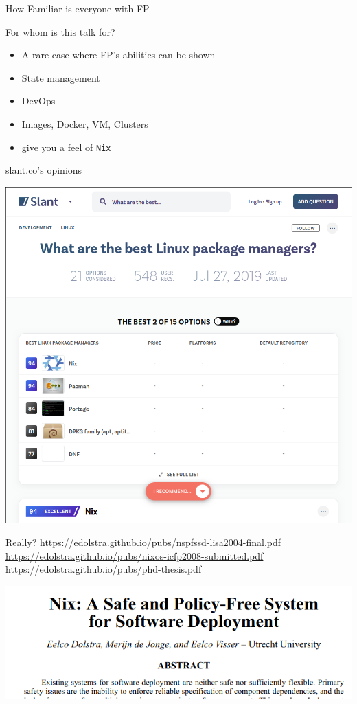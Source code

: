 \documentclass[presentation]{beamer}
\begin{document}
\begin{frame}[label={sec:org583bd86},fragile]{How Familiar is everyone with FP}
\begin{block}{For whom is this talk for?}
\begin{itemize}
\item A rare case where FP's abilities can be shown
\item State management
\item DevOps
\item Images, Docker, VM, Clusters
\item give you a feel of \texttt{Nix}
\end{itemize}
\end{block}
\begin{block}{slant.co's opinions}
\begin{center}
\includegraphics[width=.9\linewidth]{./images/screenshot-09.png}
\end{center}
\end{block}
\begin{block}{Really?}
\url{https://edolstra.github.io/pubs/nspfssd-lisa2004-final.pdf}
\url{https://edolstra.github.io/pubs/nixos-icfp2008-submitted.pdf}
\url{https://edolstra.github.io/pubs/phd-thesis.pdf}
\begin{center}
\includegraphics[width=.9\linewidth]{./images/screenshot-12.png}
\end{center}


\end{block}
\end{frame}
\end{document}
